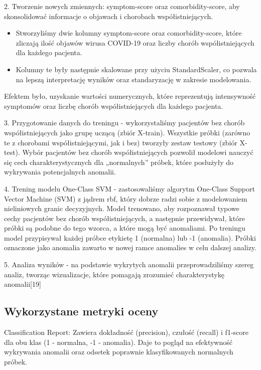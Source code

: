 \documentclass[a4paper,fleqn]{cas-dc}
\begin{document}
2. Tworzenie nowych zmiennych: symptom-score oraz comorbidity-score, aby skonsolidować informacje o objawach i chorobach współistniejących.
\begin{itemize} 
\item Stworzyliśmy dwie kolumny symptom-score oraz comorbidity-score, które zliczają ilość objawów wirusa COVID-19 oraz liczby chorób współistniejących dla każdego pacjenta.
\item  Kolumny te były następnie skalowane przy użyciu StandardScaler, co pozwala na lepszą interpretację wyników oraz standaryzację w zakresie modelowania.
\end{itemize}
Efektem było, uzyskanie wartości numerycznych, które reprezentują intensywność symptomów oraz liczbę chorób współistniejących dla każdego pacjenta.

3. Przygotowanie danych do treningu - wykorzystaliśmy pacjentów bez chorób współistniejących jako grupę uczącą (zbiór X-train). Wszystkie próbki (zarówno te z chorobami współistniejącymi, jak i bez) tworzyły zestaw testowy (zbiór X-test). 
Wybór pacjentów bez chorób współistniejących pozwolił modelowi nauczyć się cech charakterystycznych dla „normalnych” próbek, które posłużyły do wykrywania potencjalnych anomalii.

4. Trening modelu One-Class SVM - zastosowaliśmy algorytm One-Class Support Vector Machine (SVM) z jądrem rbf, który dobrze radzi sobie z modelowaniem nieliniowych granic decyzyjnych. Model trenowano, aby rozpoznawał typowe cechy pacjentów bez chorób współistniejących, a następnie przewidywał, które próbki są podobne do tego wzorca, a które mogą być anomaliami. Po treningu model przypisywał każdej próbce etykietę 1 (normalna) lub -1 (anomalia). Próbki oznaczone jako anomalia zawarto w nowej ramce anomalies w celu dalszej analizy.

5. Analiza wyników - na podstawie wykrytych anomalii przeprowadziliśmy szereg analiz, tworząc wizualizacje, które pomagają zrozumieć charakterystykę anomalii[19]

\subsection{Wykorzystane metryki oceny}


Classification Report: Zawiera dokładność (precision), czułość (recall) i f1-score dla obu klas (1 - normalna, -1 - anomalia). Daje to pogląd na efektywność wykrywania anomalii oraz odsetek poprawnie klasyfikowanych normalnych próbek.
\end{document}
